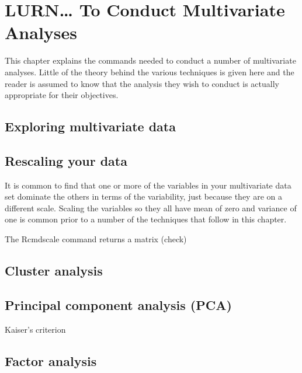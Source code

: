 

\chapter{LURN\ldots{} To Conduct Multivariate Analyses} 
\label{Multivariate} 
 

 
This chapter explains the commands needed to conduct a number of multivariate analyses. Little of the theory behind the various techniques is given here and the reader is assumed to know that the analysis they wish to conduct is actually appropriate for their objectives. 
 
\section{Exploring multivariate data} 
 
 
\section{} 
 
 
\section{Rescaling your data} 
 
It is common to find that one or more of the variables in your multivariate data set dominate the others in terms of the variability, just because they are on a different scale. Scaling the variables so they all have mean of zero and variance of one is common prior to a number of the techniques that follow in this chapter. 
 
The Rcmd{scale} command returns a matrix (check)  
 
\section{Cluster analysis} 
 
\section{Principal component analysis (PCA)} 
 
Kaiser's criterion 
 
\section{Factor analysis} 
 
